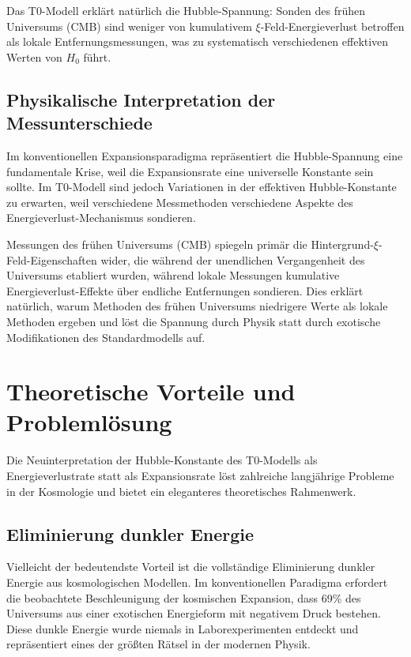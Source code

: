 \documentclass[12pt,a4paper]{article}
\begin{document}
	\begin{experimental}
		Das T0-Modell erklärt natürlich die Hubble-Spannung: Sonden des frühen Universums (CMB) sind weniger von kumulativem $\xi$-Feld-Energieverlust betroffen als lokale Entfernungsmessungen, was zu systematisch verschiedenen effektiven Werten von $H_0$ führt.
	\end{experimental}
	
	\subsection{Physikalische Interpretation der Messunterschiede}
	
	Im konventionellen Expansionsparadigma repräsentiert die Hubble-Spannung eine fundamentale Krise, weil die Expansionsrate eine universelle Konstante sein sollte. Im T0-Modell sind jedoch Variationen in der effektiven Hubble-Konstante zu erwarten, weil verschiedene Messmethoden verschiedene Aspekte des Energieverlust-Mechanismus sondieren.
	
	Messungen des frühen Universums (CMB) spiegeln primär die Hintergrund-$\xi$-Feld-Eigenschaften wider, die während der unendlichen Vergangenheit des Universums etabliert wurden, während lokale Messungen kumulative Energieverlust-Effekte über endliche Entfernungen sondieren. Dies erklärt natürlich, warum Methoden des frühen Universums niedrigere Werte als lokale Methoden ergeben und löst die Spannung durch Physik statt durch exotische Modifikationen des Standardmodells auf.
	
	\section{Theoretische Vorteile und Problemlösung}
	
	Die Neuinterpretation der Hubble-Konstante des T0-Modells als Energieverlustrate statt als Expansionsrate löst zahlreiche langjährige Probleme in der Kosmologie und bietet ein eleganteres theoretisches Rahmenwerk.
	
	\subsection{Eliminierung dunkler Energie}
	
	Vielleicht der bedeutendste Vorteil ist die vollständige Eliminierung dunkler Energie aus kosmologischen Modellen. Im konventionellen Paradigma erfordert die beobachtete Beschleunigung der kosmischen Expansion, dass 69\% des Universums aus einer exotischen Energieform mit negativem Druck bestehen. Diese dunkle Energie wurde niemals in Laborexperimenten entdeckt und repräsentiert eines der größten Rätsel in der modernen Physik.
	
\end{document}
